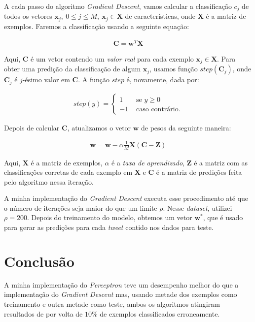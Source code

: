 \documentclass[a4paper, 12pt]{article}
\begin{document}
A cada passo do algoritmo \textit{Gradient Descent}, vamos calcular a
classificação $c_j$ de todos os vetores $\boldsymbol{x}_j,\: 0 \leq j \leq M,\: \boldsymbol{x}_j \in
\boldsymbol{X}$ de características, onde $\boldsymbol{X}$ é a matriz
de exemplos. Faremos a classificação usando a seguinte equação:

\begin{align*}
    \boldsymbol{C} = \boldsymbol{w}^{T}\boldsymbol{X}
\end{align*}

Aqui, $\boldsymbol{C}$ é um vetor contendo um \textit{valor real} para
cada exemplo $\boldsymbol{x}_j \in \boldsymbol{X}$. Para obter uma predição
da classificação de algum $\boldsymbol{x}_j$, usamos função $step(\boldsymbol{C}_j)$,
onde $\boldsymbol{C}_j$ é $j$-ésimo valor em $\boldsymbol{C}$. A função $step$
é, novamente, dada por:

\begin{align*}
    step(y) = \begin{cases}
        1 & \text{ se } y \geq 0 \\
        -1 & \text{ caso contrário.}
    \end{cases}
\end{align*}

Depois de calcular $\boldsymbol{C}$,  atualizamos o vetor $\boldsymbol{w}$
de pesos da seguinte maneira:

\begin{align*}
    \boldsymbol{w} = \boldsymbol{w} - \alpha \frac{1}{M} \boldsymbol{X}(\boldsymbol{C} - \boldsymbol{Z})
\end{align*}

Aqui, $\boldsymbol{X}$ é a matriz de exemplos, $\alpha$ é a \textit{taxa de
aprendizado}, $\boldsymbol{Z}$ é a matriz com as classificações corretas de
cada exemplo em $\boldsymbol{X}$ e $\boldsymbol{C}$ é a matriz de predições
feita pelo algoritmo nessa iteração.

A minha implementação do \textit{Gradient Descent} executa esse procedimento
até que o número de iterações seja maior do que um limite $\rho$. Nesse
\textit{dataset}, utilizei $\rho = 200$. Depois do treinamento do modelo,
obtemos um vetor $\boldsymbol{w}^{*}$, que é usado para gerar as predições para cada
\textit{tweet} contido nos dados para teste.

\section{Conclusão} \label{sec:concl}

A minha implementação do \textit{Perceptron} teve um desempenho melhor do que a
implementação do \textit{Gradient Descent} mas, usando metade dos exemplos como
treinamento e outra metade como teste, ambos os algoritmos atingiram resultados
de por volta de $10\%$ de exemplos classificados erroneamente.
\end{document}
